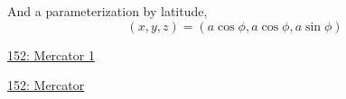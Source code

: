 \documentclass{ximera}
\begin{document}
And a parameterization by latitude,
\[
   (x,y,z) = \left(  a    \cos\phi  ,   a    \cos\phi    ,   a \sin \phi   \right)
\]

\begin{onlineOnly}
    \begin{center}
\end{center}
\end{onlineOnly}

\href{https://www.desmos.com/3d/6cqnjsuew7}{152: Mercator 1}


\begin{onlineOnly}
    \begin{center}
\end{center}
\end{onlineOnly}

\begin{onlineOnly}
    \begin{center}
\end{center}
\end{onlineOnly}

\href{https://www.geogebra.org/classic/mvp9zvge}{152: Mercator}
\end{document}
